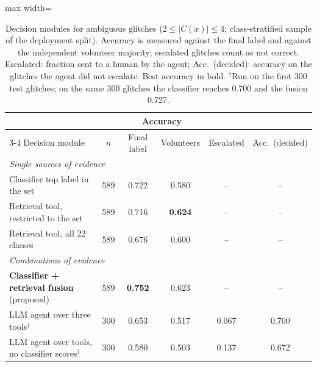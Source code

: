 \begin{table}[!htb]
\caption{Decision modules for ambiguous glitches ($2\le|C(x)|\le4$; class-stratified sample of the deployment split).
Accuracy is measured against the final label and against the independent volunteer majority; escalated glitches count as not
correct. Escalated: fraction sent to a human by the agent; Acc.\ (decided): accuracy on the glitches the agent did not escalate.
Best accuracy in bold. $^\dagger$Run on the first 300 test glitches; on the same 300 glitches the classifier reaches 0.700 and
the fusion 0.727.}\label{tab:e6}
\centering\scriptsize\setlength{\tabcolsep}{4pt}
\begin{adjustbox}{max width=\columnwidth}\begin{tabular}{lccccc}\toprule
 & & \multicolumn{2}{c}{Accuracy} & & \\\cmidrule(lr){3-4}
Decision module & $n$ & Final label & Volunteers & Escalated & Acc.\ (decided)\\\midrule
\multicolumn{6}{l}{\emph{Single sources of evidence}}\\
Classifier top label in the set & 589 & 0.722 & 0.580 & -- & --\\
Retrieval tool, restricted to the set & 589 & 0.716 & \textbf{0.624} & -- & --\\
Retrieval tool, all 22 classes & 589 & 0.676 & 0.600 & -- & --\\
\midrule
\multicolumn{6}{l}{\emph{Combinations of evidence}}\\
\textbf{Classifier + retrieval fusion} (proposed) & 589 & \textbf{0.752} & 0.623 & -- & --\\
LLM agent over three tools$^\dagger$ & 300 & 0.653 & 0.517 & 0.067 & 0.700\\
LLM agent over tools, no classifier scores$^\dagger$ & 300 & 0.580 & 0.503 & 0.137 & 0.672\\
\bottomrule
\end{tabular}\end{adjustbox}
\end{table}
